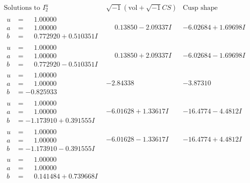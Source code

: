 \documentclass[1p]{elsarticle_modified}
\theoremstyle{definition}
\newcommand{\I}{\sqrt{-1}}
\begin{document}
$$\begin{array}{c|c|c}  
\text{Solutions to }I^u_{2}& \I (\text{vol} + \sqrt{-1}CS) & \text{Cusp shape}\\
 \hline 
\begin{aligned}
u &= \phantom{-}1.00000\phantom{ +0.000000I} \\
a &= \phantom{-}1.00000\phantom{ +0.000000I} \\
b &= \phantom{-}0.772920 + 0.510351 I\end{aligned}
 & \phantom{-}0.13850 - 2.09337 I & -6.02684 + 1.69698 I \\ \hline\begin{aligned}
u &= \phantom{-}1.00000\phantom{ +0.000000I} \\
a &= \phantom{-}1.00000\phantom{ +0.000000I} \\
b &= \phantom{-}0.772920 - 0.510351 I\end{aligned}
 & \phantom{-}0.13850 + 2.09337 I & -6.02684 - 1.69698 I \\ \hline\begin{aligned}
u &= \phantom{-}1.00000\phantom{ +0.000000I} \\
a &= \phantom{-}1.00000\phantom{ +0.000000I} \\
b &= -0.825933\phantom{ +0.000000I}\end{aligned}
 & -2.84338\phantom{ +0.000000I} & -3.87310\phantom{ +0.000000I} \\ \hline\begin{aligned}
u &= \phantom{-}1.00000\phantom{ +0.000000I} \\
a &= \phantom{-}1.00000\phantom{ +0.000000I} \\
b &= -1.173910 + 0.391555 I\end{aligned}
 & -6.01628 + 1.33617 I & -16.4774 - 4.4812 I \\ \hline\begin{aligned}
u &= \phantom{-}1.00000\phantom{ +0.000000I} \\
a &= \phantom{-}1.00000\phantom{ +0.000000I} \\
b &= -1.173910 - 0.391555 I\end{aligned}
 & -6.01628 - 1.33617 I & -16.4774 + 4.4812 I \\ \hline\begin{aligned}
u &= \phantom{-}1.00000\phantom{ +0.000000I} \\
a &= \phantom{-}1.00000\phantom{ +0.000000I} \\
b &= \phantom{-}0.141484 + 0.739668 I\end{aligned}

\end{array}$$
\end{document}
